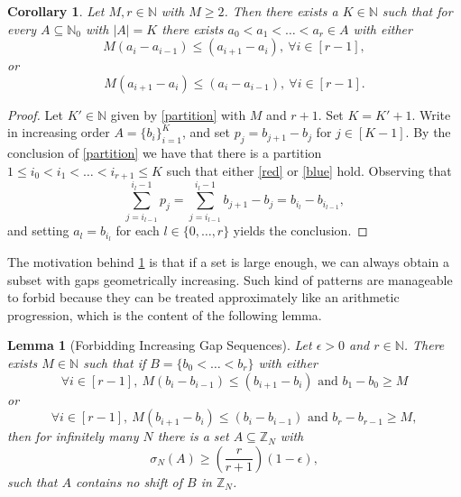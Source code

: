 \documentclass[letter, 11pt]{article}
\theoremstyle{plain} %
\newtheorem{lemma}[theorem]{Lemma}
\newtheorem{corollary}[theorem]{Corollary}
\theoremstyle{definition} %
\theoremstyle{plain}
\theoremstyle{plain}
\newcommand{\N}{\mathbb{N}}
\newcommand{\Z}{\mathbb{Z}}
\newcommand{\1}{\mathbbm{1}}
\begin{document}
\begin{corollary}\label{gaps_exist}
    Let $M, r \in \N$ with $M \geq 2$. Then there exists a $K \in \N$ such that for every $A \subseteq \N_0$ with $|A| = K$ there exists $a_0< a_1< \ldots < a_r \in A$ with either
        \[
    M(a_{i}-a_{i-1}) \leq (a_{i+1} - a_{i}), \ \forall i\in [r-1],
        \]
        or 
        \[
    M(a_{i+1} - a_{i}) \leq (a_{i}-a_{i-1}),\ \forall i\in [r-1].
        \] 
\end{corollary}
\begin{proof}
    Let $K'\in \N$ given by \cref{partition} with $M$ and $r+1$. Set $K=K'+1$. Write in increasing order $A=\{b_i\}_{i=1}^K$, and set $p_j=b_{j+1}-b_{j}$ for $j\in [K-1]$. By the conclusion of \cref{partition} we have that there is a partition $1 \leq i_0   <i_1 < \ldots < i_{r+1} \leq K$ such that either \cref{red} or \cref{blue} hold. Observing that 
    $$\sum_{j=i_{l-1}}^{i_l-1}p_j= \sum_{j=i_{l-1}}^{i_l-1} b_{j+1}-b_j= b_{i_l}-b_{i_{l-1}}, $$
    and setting $a_l=b_{i_l}$ for each $l\in \{0,\ldots,r\}$ yields the conclusion.
\end{proof}
The motivation behind \cref{gaps_exist} is that if a set is large enough, we can always obtain a subset with gaps geometrically increasing. Such kind of patterns are manageable to forbid because they can be treated approximately like an arithmetic progression, which is the content of the following lemma. 
\begin{lemma}[Forbidding Increasing Gap Sequences]\label{Forbidding-increasing-gaps}
    Let $\epsilon> 0 $ and $r\in \N$. There exists $M \in \N$ such that if $B = \{b_0 < \ldots< b_r\} $ with either $$\forall i\in [r-1], \ M(b_{i}-b_{i-1}) \leq (b_{i+1}-b_i) \text{ and } b_1-b_0 \geq M $$ or $$\forall i\in [r-1], \ M(b_{i+1}-b_i) \leq (b_{i}-b_{i-1}) \text{ and } b_r - b_{r-1} \geq M ,$$ then for infinitely many $N$ there is a set $A \subseteq \Z_N$ with $$\sigma_{N}(A) \geq \left(\frac{r}{r+1}\right) (1 - \epsilon),$$ such that $A$ contains no shift of $B$ in $\Z_N$. 
\end{lemma}
\end{document}
